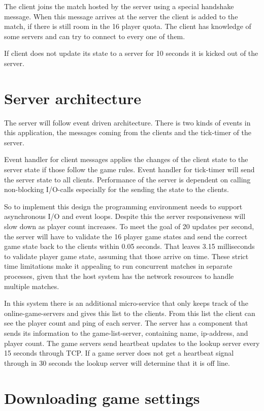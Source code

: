 \documentclass[10pt,a4paper]{article}
\begin{document}
 The client joins the match hosted by the server using a special handshake message.
 When this message arrives at the server the client is added to the match, if
 there is still room in the 16 player quota. The client has knowledge of 
 some servers and can try to connect to every one of them.

 If client does not update its state to a server for 10 seconds
 it is kicked out of the server.


\section{Server architecture}

The server will follow event driven architecture. There is two kinds of events
in this application, the messages coming from the clients and the tick-timer of the server.

Event handler for client messages applies the changes of the client state to the
server state if those follow the game rules. 
Event handler for tick-timer will send the server state to all clients.  
Performance of the server is dependent on calling non-blocking I/O-calls especially
for the sending the state to the clients.

So to implement this design the programming environment needs to support
asynchronous I/O and event loops. Despite this the server responsiveness will
slow down as player count increases. To meet the goal of 20 updates per second,
the server will have to validate the 16 player game states and send the correct
game state back to the clients within 0.05 seconds. That leaves 3.15
milliseconds to validate player game state, assuming that those arrive on time.
These strict time limitations make it appealing to run concurrent matches in
separate processes, given that the host system has the network resources to
handle multiple matches.

In this system there is an additional micro-service that only keeps track of
the online-game-servers and gives this list to the clients. From this list the
client can see the player count and ping of each server.  The server has a
component that sends its information to the game-list-server, containing name,
ip-address, and player count. The game servers send heartbeat updates to the
lookup server every 15 seconds through TCP. If a game server does not get a
heartbeat signal through in 30 seconds the lookup server will determine that it
is off line.

\section{Downloading game settings}
\end{document}
